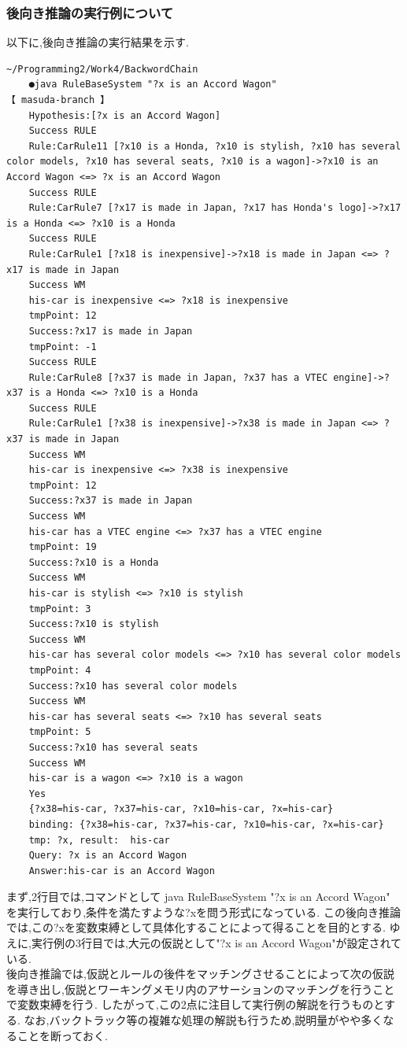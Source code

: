 \documentclass[uplatex,12pt]{jsarticle}
\begin{document}
\subsubsection{後向き推論の実行例について}
以下に,後向き推論の実行結果を示す.
\begin{lstlisting}[caption=後向き推論の実行結果, label=mid]
    ~/Programming2/Work4/BackwordChain
    ●java RuleBaseSystem "?x is an Accord Wagon"                                                                                                                                                                              【 masuda-branch 】
    Hypothesis:[?x is an Accord Wagon]
    Success RULE
    Rule:CarRule11 [?x10 is a Honda, ?x10 is stylish, ?x10 has several color models, ?x10 has several seats, ?x10 is a wagon]->?x10 is an Accord Wagon <=> ?x is an Accord Wagon
    Success RULE
    Rule:CarRule7 [?x17 is made in Japan, ?x17 has Honda's logo]->?x17 is a Honda <=> ?x10 is a Honda
    Success RULE
    Rule:CarRule1 [?x18 is inexpensive]->?x18 is made in Japan <=> ?x17 is made in Japan
    Success WM
    his-car is inexpensive <=> ?x18 is inexpensive
    tmpPoint: 12
    Success:?x17 is made in Japan
    tmpPoint: -1
    Success RULE
    Rule:CarRule8 [?x37 is made in Japan, ?x37 has a VTEC engine]->?x37 is a Honda <=> ?x10 is a Honda
    Success RULE
    Rule:CarRule1 [?x38 is inexpensive]->?x38 is made in Japan <=> ?x37 is made in Japan
    Success WM
    his-car is inexpensive <=> ?x38 is inexpensive
    tmpPoint: 12
    Success:?x37 is made in Japan
    Success WM
    his-car has a VTEC engine <=> ?x37 has a VTEC engine
    tmpPoint: 19
    Success:?x10 is a Honda
    Success WM
    his-car is stylish <=> ?x10 is stylish
    tmpPoint: 3
    Success:?x10 is stylish
    Success WM
    his-car has several color models <=> ?x10 has several color models
    tmpPoint: 4
    Success:?x10 has several color models
    Success WM
    his-car has several seats <=> ?x10 has several seats
    tmpPoint: 5
    Success:?x10 has several seats
    Success WM
    his-car is a wagon <=> ?x10 is a wagon
    Yes
    {?x38=his-car, ?x37=his-car, ?x10=his-car, ?x=his-car}
    binding: {?x38=his-car, ?x37=his-car, ?x10=his-car, ?x=his-car}
    tmp: ?x, result:  his-car
    Query: ?x is an Accord Wagon
    Answer:his-car is an Accord Wagon
\end{lstlisting}
まず,2行目では,コマンドとして java RuleBaseSystem "?x is an Accord Wagon" を実行しており,条件を満たすような?xを問う形式になっている.
この後向き推論では,この?xを変数束縛として具体化することによって得ることを目的とする.
ゆえに,実行例の3行目では,大元の仮説として"?x is an Accord Wagon"が設定されている. \\
後向き推論では,仮説とルールの後件をマッチングさせることによって次の仮説を導き出し,仮説とワーキングメモリ内のアサーションのマッチングを行うことで変数束縛を行う.
したがって,この2点に注目して実行例の解説を行うものとする.
なお,バックトラック等の複雑な処理の解説も行うため,説明量がやや多くなることを断っておく. \\
\end{document}
